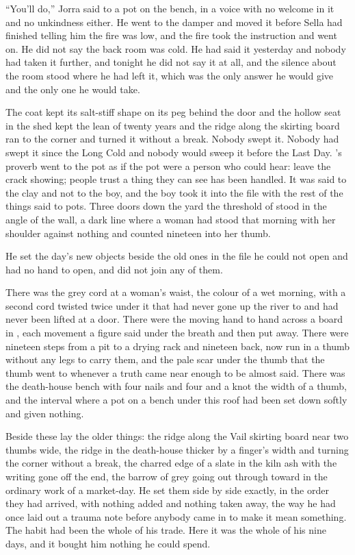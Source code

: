 “You'll do,” Jorra said to a pot on the bench, in a voice with no welcome in it and no unkindness either. He went to the damper and moved it before Sella had finished telling him the fire was low, and the fire took the instruction and went on. He did not say the back room was cold. He had said it yesterday and nobody had taken it further, and tonight he did not say it at all, and the silence about the room stood where he had left it, which was the only answer he would give and the only one he would take.

The coat kept its salt-stiff shape on its peg behind the door and the hollow seat in the shed kept the lean of twenty years and the ridge along the skirting board ran to the corner and turned it without a break. Nobody swept it. Nobody had swept it since the Long Cold and nobody would sweep it before the Last Day. 's proverb went to the pot as if the pot were a person who could hear: leave the crack showing; people trust a thing they can see has been handled. It was said to the clay and not to the boy, and the boy took it into the file with the rest of the things said to pots. Three doors down the yard the threshold of  stood in the angle of the wall, a dark line where a woman had stood that morning with her shoulder against nothing and counted nineteen into her thumb.

\scenebreak

He set the day's new objects beside the old ones in the file he could not open and had no hand to open, and did not join any of them.

There was the grey cord at a woman's waist, the colour of a wet morning, with a second cord twisted twice under it that had never gone up the river to  and had never been lifted at a door. There were the  moving hand to hand across a board in , each movement a figure said under the breath and then put away. There were nineteen steps from a pit to a drying rack and nineteen back, now run in a thumb without any legs to carry them, and the pale scar under the thumb that the thumb went to whenever a truth came near enough to be almost said. There was the death-house bench with four nails and four and a knot the width of a thumb, and the interval where a pot on a bench under this roof had been set down softly and given nothing.

Beside these lay the older things: the ridge along the Vail skirting board near two thumbs wide, the ridge in the death-house thicker by a finger's width and turning the corner without a break, the charred edge of a slate in the kiln ash with the writing gone off the end, the barrow of grey going out through  toward  in the ordinary work of a market-day. He set them side by side exactly, in the order they had arrived, with nothing added and nothing taken away, the way he had once laid out a trauma note before anybody came in to make it mean something. The habit had been the whole of his trade. Here it was the whole of his nine days, and it bought him nothing he could spend.

